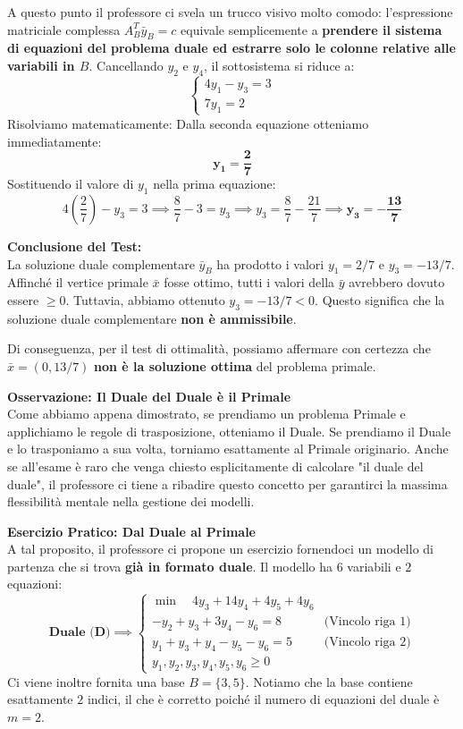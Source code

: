 \documentclass[12pt, a4paper]{article}
\begin{document}
	A questo punto il professore ci svela un trucco visivo molto comodo: l'espressione matriciale complessa $A_B^T \bar{y}_B = c$ equivale semplicemente a \textbf{prendere il sistema di equazioni del problema duale ed estrarre solo le colonne relative alle variabili in $B$}.
	Cancellando $y_2$ e $y_4$, il sottosistema si riduce a:
	\[
	\begin{cases}
		4y_1 - y_3 = 3 \\
		7y_1 = 2
	\end{cases}
	\]
	Risolviamo matematicamente:
	Dalla seconda equazione otteniamo immediatamente:
	\[
	\mathbf{y_1 = \frac{2}{7}}
	\]
	Sostituendo il valore di $y_1$ nella prima equazione:
	\[
	4\left(\frac{2}{7}\right) - y_3 = 3 \implies \frac{8}{7} - 3 = y_3 \implies y_3 = \frac{8}{7} - \frac{21}{7} \implies \mathbf{y_3 = -\frac{13}{7}}
	\]
	
	\vspace{0.4cm}
	\textbf{Conclusione del Test:}\\
	La soluzione duale complementare $\bar{y}_B$ ha prodotto i valori $y_1 = 2/7$ e $y_3 = -13/7$. 
	Affinché il vertice primale $\bar{x}$ fosse ottimo, tutti i valori della $\bar{y}$ avrebbero dovuto essere $\geq 0$. 
	Tuttavia, abbiamo ottenuto \textbf{$y_3 = -13/7 < 0$}. Questo significa che la soluzione duale complementare \textbf{non è ammissibile}. 
	
	Di conseguenza, per il test di ottimalità, possiamo affermare con certezza che $\bar{x} = (0, 13/7)$ \textbf{non è la soluzione ottima} del problema primale.
	
	\vspace{0.6cm}
	\textbf{Osservazione: Il Duale del Duale è il Primale}\\
	Come abbiamo appena dimostrato, se prendiamo un problema Primale e applichiamo le regole di trasposizione, otteniamo il Duale. Se prendiamo il Duale e lo trasponiamo a sua volta, torniamo esattamente al Primale originario. Anche se all'esame è raro che venga chiesto esplicitamente di calcolare "il duale del duale", il professore ci tiene a ribadire questo concetto per garantirci la massima flessibilità mentale nella gestione dei modelli.
	
	\vspace{0.4cm}
	\textbf{Esercizio Pratico: Dal Duale al Primale}\\
	A tal proposito, il professore ci propone un esercizio fornendoci un modello di partenza che si trova \textbf{già in formato duale}. Il modello ha $6$ variabili e $2$ equazioni:
	\[
	\textbf{Duale (D)} \implies
	\begin{cases}
		\min \quad 4y_3 + 14y_4 + 4y_5 + 4y_6 \\[6pt]
		-y_2 + y_3 + 3y_4 - y_6 = 8 \quad &\text{(Vincolo riga 1)} \\
		y_1 + y_3 + y_4 - y_5 - y_6 = 5 \quad &\text{(Vincolo riga 2)} \\[6pt]
		y_1, y_2, y_3, y_4, y_5, y_6 \geq 0
	\end{cases}
	\]
	Ci viene inoltre fornita una base $B = \{3, 5\}$. Notiamo che la base contiene esattamente $2$ indici, il che è corretto poiché il numero di equazioni del duale è $m = 2$.
	
\end{document}

